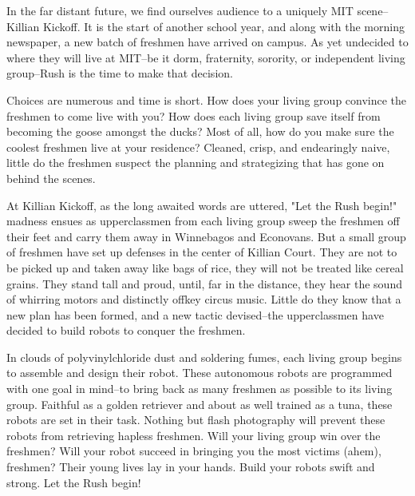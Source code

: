 In the far distant future, we find ourselves audience to a uniquely
MIT scene--Killian Kickoff.  It is the start of another school year,
and along with the morning newspaper, a new batch of freshmen have
arrived on campus.  As yet undecided to where they will live at
MIT--be it dorm, fraternity, sorority, or independent living
group--Rush is the time to make that decision.

Choices are numerous and time is short.  How does your living group
convince the freshmen to come live with you?  How does each living
group save itself from becoming the goose amongst the ducks?  Most of
all, how do you make sure the coolest freshmen live at your residence?
Cleaned, crisp, and endearingly naive, little do the freshmen suspect
the planning and strategizing that has gone on behind the scenes.

At Killian Kickoff, as the long awaited words are uttered, "Let the
Rush begin!" madness ensues as upperclassmen from each living group
sweep the freshmen off their feet and carry them away in Winnebagos
and Econovans.  But a small group of freshmen have set up defenses in
the center of Killian Court.  They are not to be picked up and taken
away like bags of rice, they will not be treated like cereal grains.
They stand tall and proud, until, far in the distance, they hear the
sound of whirring motors and distinctly offkey circus music.  Little
do they know that a new plan has been formed, and a new tactic
devised--the upperclassmen have decided to build robots to conquer the
freshmen.

In clouds of polyvinylchloride dust and soldering fumes, each living
group begins to assemble and design their robot.  These autonomous
robots are programmed with one goal in mind--to bring back as many
freshmen as possible to its living group.  Faithful as a golden
retriever and about as well trained as a tuna, these robots are set in
their task.  Nothing but flash photography will prevent these robots
from retrieving hapless freshmen.  Will your living group win over the
freshmen?  Will your robot succeed in bringing you the most victims
(ahem), freshmen?  Their young lives lay in your hands.  Build your
robots swift and strong.  Let the Rush begin!

